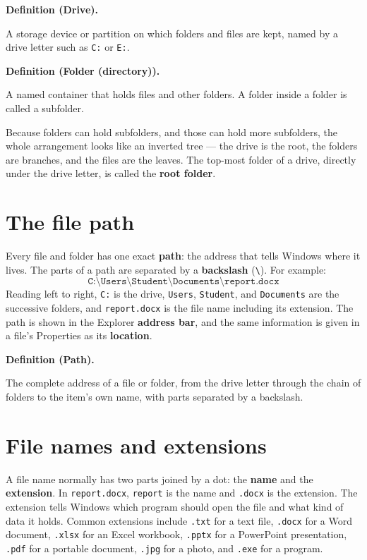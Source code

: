 \documentclass[11pt]{article}
\newenvironment{definitionbox}[1]{%
  \par\noindent\textbf{Definition (#1).}\ \itshape
}{\par\vspace{0.3em}}
\begin{document}
\begin{definitionbox}{Drive}
A storage device or partition on which folders and files are kept, named by
a drive letter such as \texttt{C:} or \texttt{E:}.
\end{definitionbox}

\begin{definitionbox}{Folder (directory)}
A named container that holds files and other folders. A folder inside a
folder is called a subfolder.
\end{definitionbox}

Because folders can hold subfolders, and those can hold more subfolders, the
whole arrangement looks like an inverted tree --- the drive is the root, the
folders are branches, and the files are the leaves. The top-most folder of a
drive, directly under the drive letter, is called the \textbf{root folder}.

\section{The file path}
Every file and folder has one exact \textbf{path}: the address that tells
Windows where it lives. The parts of a path are separated by a
\textbf{backslash} (\verb|\|). For example:
\[
\texttt{C:\textbackslash Users\textbackslash Student\textbackslash
Documents\textbackslash report.docx}
\]
Reading left to right, \texttt{C:} is the drive, \texttt{Users},
\texttt{Student}, and \texttt{Documents} are the successive folders, and
\texttt{report.docx} is the file name including its extension. The path is
shown in the Explorer \textbf{address bar}, and the same information is given
in a file's Properties as its \textbf{location}.

\begin{definitionbox}{Path}
The complete address of a file or folder, from the drive letter through the
chain of folders to the item's own name, with parts separated by a backslash.
\end{definitionbox}

\section{File names and extensions}
A file name normally has two parts joined by a dot: the \textbf{name} and the
\textbf{extension}. In \texttt{report.docx}, \texttt{report} is the name and
\texttt{.docx} is the extension. The extension tells Windows which program
should open the file and what kind of data it holds. Common extensions
include \texttt{.txt} for a text file, \texttt{.docx} for a Word document,
\texttt{.xlsx} for an Excel workbook, \texttt{.pptx} for a PowerPoint
presentation, \texttt{.pdf} for a portable document, \texttt{.jpg} for a
photo, and \texttt{.exe} for a program.
\end{document}
